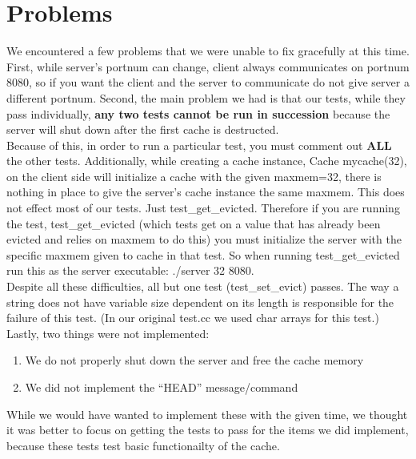 \documentclass[12pt]{article}
\begin{document}
\section{Problems}
We encountered a few problems that we were unable to fix gracefully at this time. First, while server's portnum can change, client always communicates on portnum 8080, so if you want the client and the server to communicate do not give server a different portnum. Second, the main problem we had is that our tests, while they pass individually, \textbf{any two tests cannot be run in succession} because the server will shut down after the first cache is destructed.\\

Because of this, in order to run a particular test, you must comment out \textbf{ALL} the other tests. Additionally, while creating a cache instance, Cache mycache(32), on the client side will initialize a cache with the given maxmem=32, there is nothing in place to give the server's cache instance the same maxmem. This does not effect most of our tests. Just test\_get\_evicted. Therefore if you are running the test, test\_get\_evicted (which tests get on a value that has already been evicted and relies on maxmem to do this) you must initialize the server with the specific maxmem given to cache in that test. So when running test\_get\_evicted run this as the server executable: ./server 32 8080.\\

Despite all these difficulties, all but one test (test\_set\_evict) passes. The way a string does not have variable size dependent on its length is responsible for the failure of this test. (In our original test.cc we used char arrays for this test.)\\

Lastly, two things were not implemented:
\begin{enumerate}
\item We do not properly shut down the server and free the cache memory
\item We did not implement the ``HEAD'' message/command
\end{enumerate}
While we would have wanted to implement these with the given time, we thought it was better to focus on getting the tests to pass for the items we did implement, because these tests test basic functionailty of the cache.
\end{document}
